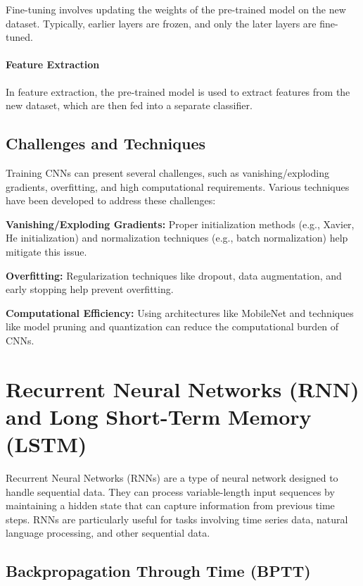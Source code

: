 \documentclass[12pt]{article}
\begin{document}
Fine-tuning involves updating the weights of the pre-trained model on the new dataset. Typically, earlier layers are frozen, and only the later layers are fine-tuned.

\paragraph{Feature Extraction}

In feature extraction, the pre-trained model is used to extract features from the new dataset, which are then fed into a separate classifier.

\subsection{Challenges and Techniques}

Training CNNs can present several challenges, such as vanishing/exploding gradients, overfitting, and high computational requirements. Various techniques have been developed to address these challenges:

\textbf{Vanishing/Exploding Gradients:} Proper initialization methods (e.g., Xavier, He initialization) and normalization techniques (e.g., batch normalization) help mitigate this issue.

\textbf{Overfitting:} Regularization techniques like dropout, data augmentation, and early stopping help prevent overfitting.

\textbf{Computational Efficiency:} Using architectures like MobileNet and techniques like model pruning and quantization can reduce the computational burden of CNNs.


\section{Recurrent Neural Networks (RNN) and Long Short-Term Memory (LSTM)}

Recurrent Neural Networks (RNNs) are a type of neural network designed to handle sequential data. They can process variable-length input sequences by maintaining a hidden state that can capture information from previous time steps. RNNs are particularly useful for tasks involving time series data, natural language processing, and other sequential data.

\subsection{Backpropagation Through Time (BPTT)}
\end{document}
